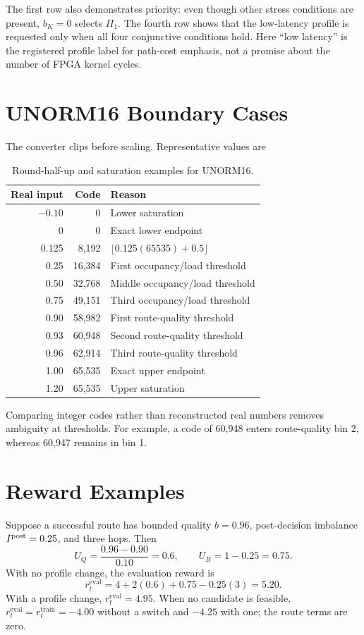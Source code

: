 The first row also demonstrates priority: even though other stress conditions are
present, $b_K=0$ selects $\Pi_1$. The fourth row shows that the low-latency profile
is requested only when all four conjunctive conditions hold. Here ``low latency''
is the registered profile label for path-cost emphasis, not a promise about the
number of FPGA kernel cycles.

\section{UNORM16 Boundary Cases}

The converter clips before scaling. Representative values are
\begin{table}[H]
\centering
\caption{Round-half-up and saturation examples for UNORM16.}
\label{tab:worked-unorm16}
\begin{tabular}{@{}r r l@{}}
\toprule
\textbf{Real input} & \textbf{Code} & \textbf{Reason}\\
\midrule
$-0.10$ & 0 & Lower saturation\\
0 & 0 & Exact lower endpoint\\
0.125 & 8,192 & $\lfloor0.125(65535)+0.5\rfloor$\\
0.25 & 16,384 & First occupancy/load threshold\\
0.50 & 32,768 & Middle occupancy/load threshold\\
0.75 & 49,151 & Third occupancy/load threshold\\
0.90 & 58,982 & First route-quality threshold\\
0.93 & 60,948 & Second route-quality threshold\\
0.96 & 62,914 & Third route-quality threshold\\
1.00 & 65,535 & Exact upper endpoint\\
1.20 & 65,535 & Upper saturation\\
\bottomrule
\end{tabular}
\end{table}

Comparing integer codes rather than reconstructed real numbers removes ambiguity at
thresholds. For example, a code of 60,948 enters route-quality bin 2, whereas 60,947
remains in bin 1.

\section{Reward Examples}

Suppose a successful route has bounded quality $b=0.96$, post-decision imbalance
$I^{\rm post}=0.25$, and three hops. Then
\begin{equation}
U_Q=\frac{0.96-0.90}{0.10}=0.6,
\qquad U_B=1-0.25=0.75.
\end{equation}
With no profile change, the evaluation reward is
\begin{equation}
r_t^{\mathrm{eval}}=4+2(0.6)+0.75-0.25(3)=5.20.
\end{equation}
With a profile change, $r_t^{\mathrm{eval}}=4.95$. When no candidate is feasible,
$r_t^{\mathrm{eval}}=r_t^{\mathrm{train}}=-4.00$ without a switch and $-4.25$
with one; the route terms are zero.

